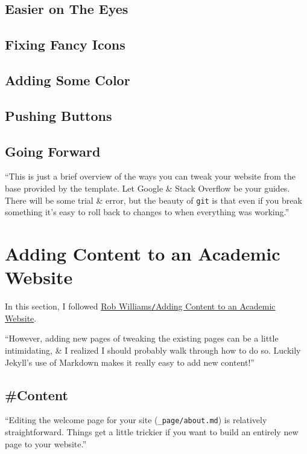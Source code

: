 \documentclass{article}
\numberwithin{equation}{section}
\begin{document}
\subsection{Easier on The Eyes}

\subsection{Fixing Fancy Icons}

\subsection{Adding Some Color}

\subsection{Pushing Buttons}

\subsection{Going Forward}
``This is just a brief overview of the ways you can tweak your website from the base provided by the template. Let Google \& Stack Overflow be your guides. There will be some trial \& error, but the beauty of \texttt{git} is that even if you break something it's easy to roll back to changes to when everything was working.''

\section{Adding Content to an Academic Website}
In this section, I followed \href{https://jayrobwilliams.com/posts/2020/08/website-content/}{Rob Williams\texttt{/}Adding Content to an Academic Website}.

``However, adding new pages of tweaking the existing pages can be a little intimidating, \& I realized I should probably walk through how to do so. Luckily Jekyll's use of Markdown makes it really easy to add new content!''

\subsection{\#Content}
``Editing the welcome page for your site (\verb|_page/about.md|) is relatively straightforward. Things get a little trickier if you want to build an entirely new page to your website.''
\end{document}
